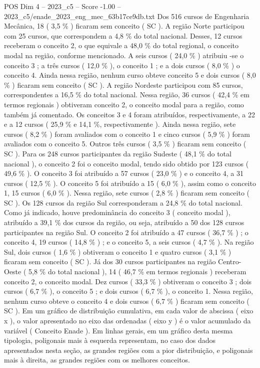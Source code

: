 \begin{textsample}{POS Dim 4 – 2023\_c5 – Score -1.00 – 2023\_c5/enade\_2023\_eng\_mec\_63b17ce9db.txt}
Dos 516 cursos de Engenharia Mecânica, 18 ( 3,5 \% ) ficaram sem conceito ( SC ).
A região Norte participou com 25 cursos, que correspondem a 4,8 \% do total nacional.
Desses, 12 cursos receberam o conceito 2, o que equivale a 48,0 \% do total regional, o conceito modal na região, conforme mencionado.
A seis cursos ( 24,0 \% ) atribuiu -se o conceito 3 ; a três cursos ( 12,0 \% ), o conceito 1 ; e a dois cursos ( 8,0 \% ) o conceito 4.
Ainda nessa região, nenhum curso obteve conceito 5 e dois cursos ( 8,0 \% ) ficaram sem conceito ( SC ).
A região Nordeste participou com 85 cursos, correspondentes a 16,5 \% do total nacional.
Nessa região, 36 cursos ( 42,4 \% em termos regionais ) obtiveram conceito 2, o conceito modal para a região, como também já comentado.
Os conceitos 3 e 4 foram atribuídos, respectivamente, a 22 e a 12 cursos ( 25,9 \% e 14,1 \%, respectivamente ).
Ainda nessa região, sete cursos ( 8,2 \% ) foram avaliados com o conceito 1 e cinco cursos ( 5,9 \% ) foram avaliados com o conceito 5.
Outros três cursos ( 3,5 \% ) ficaram sem conceito ( SC ).
Para os 248 cursos participantes da região Sudeste ( 48,1 \% do total nacional ), o conceito 2 foi o conceito modal, tendo sido obtido por 123 cursos ( 49,6 \% ).
O conceito 3 foi atribuído a 57 cursos ( 23,0 \% ) e o conceito 4, a 31 cursos ( 12,5 \% ).
O conceito 5 foi atribuído a 15 ( 6,0 \% ), assim como o conceito 1, 15 cursos ( 6,0 \% ).
Nessa região, sete cursos ( 2,8 \% ) ficaram sem conceito ( SC ).
Os 128 cursos da região Sul corresponderam a 24,8 \% do total nacional.
Como já indicado, houve predominância do conceito 3 ( conceito modal ), atribuído a 39,1 \% dos cursos da região, ou seja, atribuído a 50 dos 128 cursos participantes na região Sul.
O conceito 2 foi atribuído a 47 cursos ( 36,7 \% ) ; o conceito 4, 19 cursos ( 14,8 \% ) ; e o conceito 5, a seis cursos ( 4,7 \% ).
Na região Sul, dois cursos ( 1,6 \% ) obtiveram o conceito 1 e quatro cursos ( 3,1 \% ) ficaram sem conceito ( SC ).
Já dos 30 cursos participantes na região Centro-Oeste ( 5,8 \% do total nacional ), 14 ( 46,7 \% em termos regionais ) receberam conceito 2, o conceito modal.
Dez cursos ( 33,3 \% ) obtiveram o conceito 3 ; dois cursos ( 6,7 \% ), o conceito 5 ; e dois cursos ( 6,7 \% ), o conceito 1.
Nessa região, nenhum curso obteve o conceito 4 e dois cursos ( 6,7 \% ) ficaram sem conceito ( SC ).
Em um gráfico de distribuição cumulativa, em cada valor de abscissa ( eixo x ), o valor apresentado no eixo das ordenadas ( eixo y ) é o valor acumulado da variável ( Conceito Enade ).
Em linhas gerais, em um gráfico desta mesma tipologia, poligonais mais à esquerda representam, no caso dos dados apresentados nesta seção, as grandes regiões com a pior distribuição, e poligonais mais à direita, as grandes regiões com os melhores conceitos.

\end{textsample}
